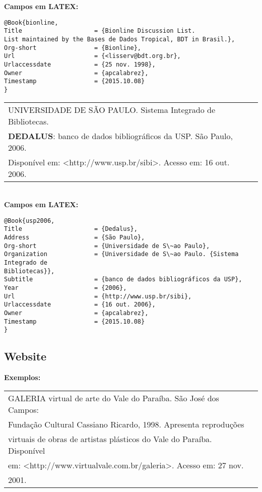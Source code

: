 \textbf{Campos em LATEX:} 

\begin{verbatim}
@Book{bionline,
Title                    = {Bionline Discussion List.  
List maintained by the Bases de Dados Tropical, BDT in Brasil.},
Org-short                = {Bionline},
Url                      = {<lisserv@bdt.org.br},
Urlaccessdate            = {25 nov. 1998},
Owner                    = {apcalabrez},
Timestamp                = {2015.10.08}
}

\end{verbatim}

\begin{tabular}{|l|c|} \hline
UNIVERSIDADE DE SÃO PAULO. Sistema Integrado de Bibliotecas. \\\textbf{DEDALUS}: banco de dados bibliográficos da USP. São Paulo, 2006. \\Disponível em: <http://www.usp.br/sibi>. Acesso em: 16 out. 2006. 
	\\\hline
\end{tabular} \\

\textbf{Campos em LATEX:} 

\begin{verbatim}
@Book{usp2006,
Title                    = {Dedalus},
Address                  = {São Paulo},
Org-short                = {Universidade de S\~ao Paulo},
Organization             = {Universidade de S\~ao Paulo. {Sistema 
Integrado de 
Bibliotecas}},
Subtitle                 = {banco de dados bibliográficos da USP},
Year                     = {2006},
Url                      = {http://www.usp.br/sibi},
Urlaccessdate            = {16 out. 2006},
Owner                    = {apcalabrez},
Timestamp                = {2015.10.08}
}
\end{verbatim}

\subsection{Website}

\textbf{Exemplos:} \\

\begin{tabular}{|l|c|} \hline
GALERIA virtual de arte do Vale do Paraíba. São José dos Campos: \\Fundação Cultural Cassiano Ricardo, 1998. Apresenta reproduções \\virtuais de obras de artistas plásticos do Vale do Paraíba. Disponível \\em: <http://www.virtualvale.com.br/galeria>. Acesso em: 27 nov. \\2001. 
	\\\hline
\end{tabular} \\

